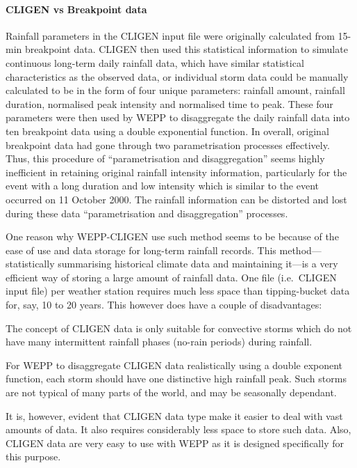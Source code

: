 \paragraph{CLIGEN vs Breakpoint data} Rainfall parameters in the CLIGEN
input file were originally calculated from 15-min breakpoint data. CLIGEN then
used this statistical information to simulate continuous long-term daily
rainfall data, which have similar statistical characteristics as the observed
data, or individual storm data could be manually calculated to be in the form of
four unique parameters: rainfall amount, rainfall duration, normalised peak
intensity and normalised time to peak. These four parameters were then used by
WEPP to disaggregate the daily rainfall data into ten breakpoint data using a
double exponential function. In overall, original breakpoint data had gone
through two parametrisation processes effectively. Thus, this procedure of
``parametrisation and disaggregation'' seems highly inefficient in retaining
original rainfall intensity information, particularly for the event with a long
duration and low intensity which is similar to the event occurred on 11 October
2000. The rainfall information can be distorted and lost during these data
``parametrisation and disaggregation'' processes.

One reason why WEPP-CLIGEN use such method seems to be because of the ease of
use and data storage for long-term rainfall records. This method---statistically
summarising historical climate data and maintaining it---is a very efficient way
of storing a large amount of rainfall data. One file (i.e.\ CLIGEN input file)
per weather station requires much less space than tipping-bucket data for, say,
10 to 20 years. This however does have a couple of disadvantages:
\begin{enumerate*}
  \item The concept of CLIGEN data is only suitable for convective storms which
do not have many intermittent rainfall phases (no-rain periods) during rainfall.
\medskip
  \item For WEPP to disaggregate CLIGEN data realistically using a double
exponent function, each storm should have one distinctive high rainfall peak.
Such storms are not typical of many parts of the world, and may be seasonally
dependant.
\end{enumerate*}
It is, however, evident that CLIGEN data type make it easier to deal with vast
amounts of data. It also requires considerably less space to store such data.
Also, CLIGEN data are very easy to use with WEPP as it is designed specifically
for this purpose.

